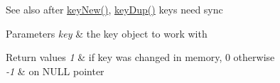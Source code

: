 \begin{DoxySeeAlso}{See also}
after \mbox{\hyperlink{group__key_gad23c65b44bf48d773759e1f9a4d43b89}{key\+New()}}, \mbox{\hyperlink{group__key_gae6ec6a60cc4b8c1463fa08623d056ce3}{key\+Dup()}} keys need sync
\end{DoxySeeAlso}

\begin{DoxyParams}{Parameters}
{\em key} & the key object to work with \\
\hline
\end{DoxyParams}

\begin{DoxyRetVals}{Return values}
{\em 1} & if {\ttfamily key} was changed in memory, 0 otherwise \\
\hline
{\em -\/1} & on N\+U\+LL pointer \\
\hline
\end{DoxyRetVals}

